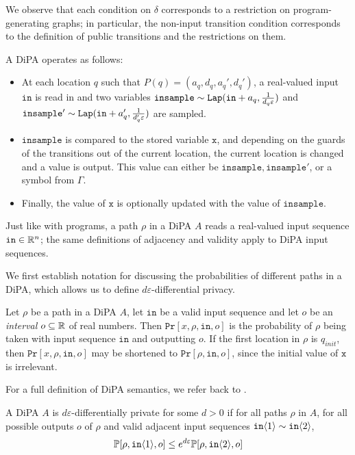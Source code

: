 We observe that each condition on $\delta$ corresponds to a restriction on program-generating graphs; in particular, the non-input transition condition corresponds to the definition of public transitions and the restrictions on them. 

A DiPA operates as follows: 
\begin{itemize}
    \item At each location $q$ such that $P(q) = (a_q, d_q, a_q', d_q')$, a real-valued input $\texttt{in}$ is read in and two variables $\texttt{insample}\sim \texttt{Lap}(\texttt{in}+a_q, \frac{1}{d_q\varepsilon})$ and $\texttt{insample}'\sim\texttt{Lap}(\texttt{in}+a_q', \frac{1}{d_q'\varepsilon})$ are sampled.
    \item $\texttt{insample}$ is compared to the stored variable $\texttt{x}$, and depending on the guards of the transitions out of the current location, the current location is changed and a value is output. This value can either be $\texttt{insample}, \texttt{insample}'$, or a symbol from $\Gamma$.
    \item Finally, the  value of $\texttt{x}$ is optionally updated with the value of $\texttt{insample}$.
\end{itemize}

Just like with programs, a path $\rho$ in a DiPA $A$ reads a real-valued input sequence $\texttt{in}\in \mathbb{R}^n$; the same definitions of adjacency and validity apply to DiPA input sequences.

We first establish notation for discussing the probabilities of different paths in a DiPA, which allows us to define $d\varepsilon$-differential privacy. 

\begin{defn} 
    Let $\rho$ be a path in a DiPA $A$, let $\texttt{in}$ be a valid input sequence and let $o$ be an \textit{interval} $o\subseteq \mathbb{R}$ of real numbers.
    Then $\texttt{Pr}[x, \rho, \texttt{in}, o]$ is the probability of $\rho$ being taken with input sequence $\texttt{in}$ and outputting $o$. If the first location in $\rho$ is $q_{init}$, then $\texttt{Pr}[x, \rho, \texttt{in}, o]$ may be shortened to $\texttt{Pr}[\rho, \texttt{in}, o]$, since the initial value of $\texttt{x}$ is irrelevant.
\end{defn}

For a full definition of DiPA semantics, we refer back to \cite{chadhaLinearTimeDecidability2021}. 

\begin{defn}
    A DiPA $A$ is $d\varepsilon$-differentially private for some $d>0$ if for all paths $\rho$ in $A$, for all possible outputs $o$ of $\rho$ and valid adjacent input sequences $\texttt{in}\langle1 \rangle\sim \texttt{in}\langle2 \rangle$, \[
        \mathbb{P}[\rho, \texttt{in}\langle1 \rangle, o]\leq e^{d\varepsilon} \mathbb{P}[\rho, \texttt{in}\langle2 \rangle, o]
    \]
\end{defn}


